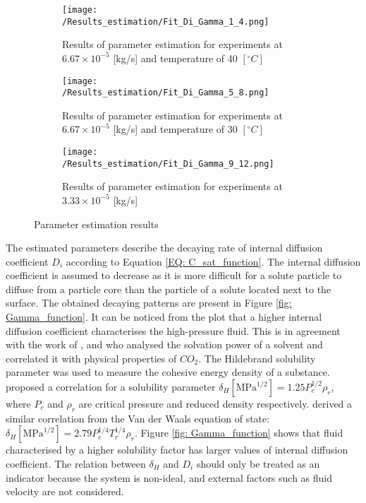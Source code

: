 \documentclass[../Supercritical_fluid_extraction_of_essential_oil_from_chamomile.tex]{subfiles}
\begin{document}
	\begin{figure}[!h]
		\centering
		\begin{subfigure}[b]{\columnwidth}
			\centering
			\texttt{[image: /Results\_estimation/Fit\_Di\_Gamma\_1\_4.png]}
			\caption{Results of parameter estimation for experiments at $6.67\times 10^{-5}$ [kg/s] and temperature of 40 $[^\circ C]$}
			\label{fig: Fit_1_4_Di_Gamma}
		\end{subfigure}
		\hfill
		\begin{subfigure}[b]{\columnwidth}
			\centering
			\texttt{[image: /Results\_estimation/Fit\_Di\_Gamma\_5\_8.png]}
			\caption{Results of parameter estimation for experiments at $6.67\times 10^{-5}$ [kg/s] and temperature of 30 $[^\circ C]$}
			\label{fig: Fit_5_8_Di_Gamma}
		\end{subfigure}
		\hfil
		\begin{subfigure}[b]{\columnwidth}
			\centering
			\texttt{[image: /Results\_estimation/Fit\_Di\_Gamma\_9\_12.png]}
			\caption{Results of parameter estimation for experiments at $3.33\times 10^{-5}$ [kg/s]}
			\label{fig: Fit_9_12_Di_Gamma}
		\end{subfigure}
		\caption{Parameter estimation results}
		\label{fig: Fit_Di_Gamma}
	\end{figure}
	
	The estimated parameters describe the decaying rate of internal diffusion coefficient $D_i$ according to Equation \ref{EQ: C_sat_function}. The internal diffusion coefficient is assumed to decrease as it is more difficult for a solute particle to diffuse from a particle core than the particle of a solute located next to the surface. The obtained decaying patterns are present in Figure \ref{fig: Gamma_function}. It can be noticed from the plot that a higher internal diffusion coefficient characterises the high-pressure fluid. This is in agreement with the work of \citet{Giddings1968}, \citet{Gurdial1989} and \citet{Machida2011} who analysed the solvation power of a solvent and correlated it with physical properties of $CO_2$. The Hildebrand solubility parameter was used to measure the cohesive energy density of a substance. \citet{Giddings1968} proposed a correlation for a solubility parameter $\delta_H[\text{MPa}^{1/2}] = 1.25 P_c^{1/2}\rho_r$, where $P_c$ and $\rho_r$ are critical pressure and reduced density respectively. \citet{Marcus2006} derived a similar correlation from the Van der Waals equation of state: $\delta_H[\text{MPa}^{1/2}] = 2.79 P_c^{1/4}T_r^{1/4}\rho_r$. Figure \ref{fig: Gamma_function} shows that fluid characterised by a higher solubility factor has larger values of internal diffusion coefficient. The relation between $\delta_H$ and $D_i$ should only be treated as an indicator because the system is non-ideal, and external factors such as fluid velocity are not considered.
	
\end{document}
